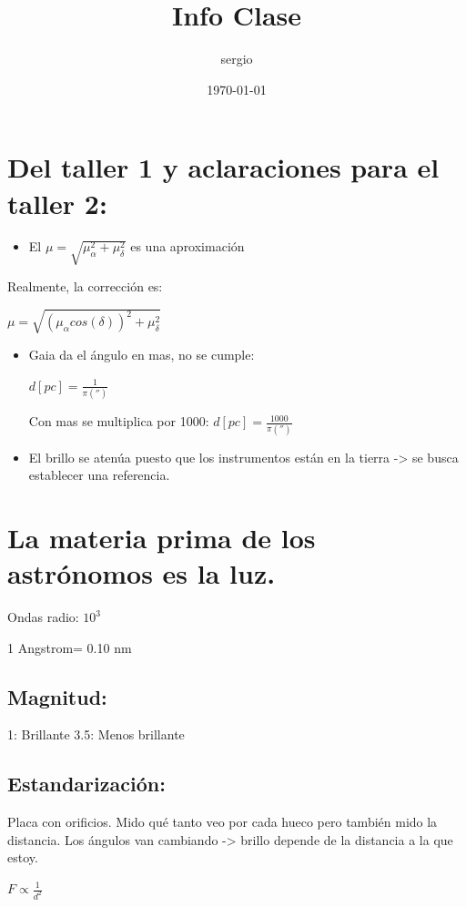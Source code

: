 \documentclass[11pt]{article}
\author{sergio}
\date{\today}
\title{Info Clase}
\begin{document}
\maketitle
\tableofcontents

\section{Del taller 1 y aclaraciones para el taller 2:}
\label{sec:org65a09dd}

\begin{itemize}
\item El \(\mu = \sqrt{\mu_\alpha^2+\mu_\delta^2}\) es una aproximación
\end{itemize}
Realmente, la corrección es:


\(\mu = \sqrt{(\mu_\alpha cos(\delta))^2 + \mu_\delta^2}\)

\begin{itemize}
\item Gaia da el ángulo en mas, no se cumple:

\(d[pc] = \frac{1}{\pi ('')}\)

Con mas se multiplica por 1000:
\(d[pc] = \frac{1000}{\pi ('')}\)

\item El brillo se atenúa puesto que los instrumentos están en la tierra -> se busca establecer una referencia.
\end{itemize}
\section{La materia prima de los astrónomos es la luz.}
\label{sec:org175e334}

Ondas radio: \(10^3\)

1 Angstrom= 0.10 nm 
\subsection{Magnitud:}
\label{sec:orgfb4844d}

1: Brillante
3.5: Menos brillante
\subsection{Estandarización:}
\label{sec:org9db7bcd}
Placa con orificios.
Mido qué tanto veo por cada hueco pero también mido la distancia.
Los ángulos van cambiando -> brillo depende de la distancia a la que estoy.

\(F \propto \frac{1}{d^2}\)
\end{document}
